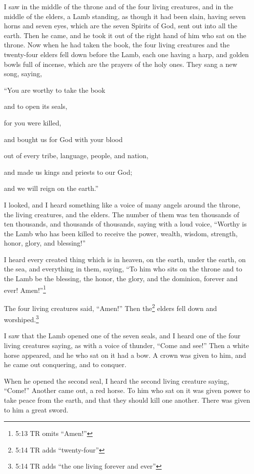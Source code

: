\myverse{}I saw in the middle of the throne and of the four living creatures,
and in the middle of the elders, a Lamb standing, as though it had been slain, having seven horns and
seven eyes, which are the seven Spirits of God, sent out into all the earth.
\myverse{}Then he came, and he took it out of the right hand of him who sat on the throne.
\myverse{}Now when he had taken the book, the four living creatures and the twenty-four
elders fell down before the Lamb, each one having a harp, and golden bowls full of incense, which are
the prayers of the holy ones.
\myverse{}They sang a new song, saying,

“You are worthy to take the book

and to open its seals,

for you were killed,

and bought us for God with your blood

out of every tribe, language, people, and nation,

\myverse{}and made us kings and priests to our God;

and we will reign on the earth.”

\myverse{}I looked, and I heard something like a voice of many angels around
the throne, the living creatures, and the elders. The number of them was ten thousands of ten thousands,
and thousands of thousands,
\myverse{}saying with a loud voice, “Worthy is the Lamb who has been killed to receive
the power, wealth, wisdom, strength, honor, glory, and blessing!”

\myverse{}I heard every created thing which is in heaven, on the earth,
under the earth, on the sea, and everything in them, saying, “To him who sits on the throne and to the
Lamb be the blessing, the honor, the glory, and the dominion, forever and ever! Amen!”\footnote{5:13 TR omits “Amen!”}

\myverse{}The four living creatures said, “Amen!” Then the\footnote{5:14 TR adds “twenty-four”} elders fell down and worshiped.\footnote{5:14 TR adds “the one living forever and ever”}



\mychapter{} \myverse*{}I saw that the Lamb opened one of the seven seals, and I heard
one of the four living creatures saying, as with a voice of thunder, “Come and see!”
\myverse{}Then a white horse appeared, and he who sat on it had a bow. A crown was given
to him, and he came out conquering, and to conquer.

\myverse{}When he opened the second seal, I heard the second living creature
saying, “Come!”
\myverse{}Another came out, a red horse. To him who sat on it was given power to take
peace from the earth, and that they should kill one another. There was given to him a great sword.

